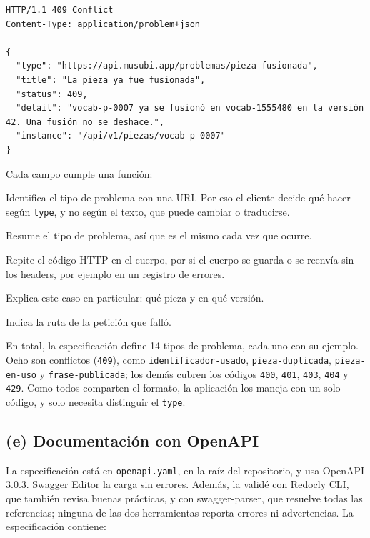 \documentclass[11pt]{article}
\begin{document}
\begin{lstlisting}
HTTP/1.1 409 Conflict
Content-Type: application/problem+json

{
  "type": "https://api.musubi.app/problemas/pieza-fusionada",
  "title": "La pieza ya fue fusionada",
  "status": 409,
  "detail": "vocab-p-0007 ya se fusionó en vocab-1555480 en la versión 42. Una fusión no se deshace.",
  "instance": "/api/v1/piezas/vocab-p-0007"
}
\end{lstlisting}

Cada campo cumple una función:

\begin{description}
  \raggedright
  \item[\texttt{type}.] Identifica el tipo de problema con una URI. Por eso el cliente decide qué hacer según \texttt{type}, y no según el texto, que puede cambiar o traducirse.
  \item[\texttt{title}.] Resume el tipo de problema, así que es el mismo cada vez que ocurre.
  \item[\texttt{status}.] Repite el código HTTP en el cuerpo, por si el cuerpo se guarda o se reenvía sin los headers, por ejemplo en un registro de errores.
  \item[\texttt{detail}.] Explica este caso en particular: qué pieza y en qué versión.
  \item[\texttt{instance}.] Indica la ruta de la petición que falló.
\end{description}

En total, la especificación define 14 tipos de problema, cada uno con su ejemplo. Ocho son conflictos (\texttt{409}), como \texttt{identificador-usado}, \texttt{pieza-duplicada}, \texttt{pieza-en-uso} y \texttt{frase-publicada}; los demás cubren los códigos \texttt{400}, \texttt{401}, \texttt{403}, \texttt{404} y \texttt{429}. Como todos comparten el formato, la aplicación los maneja con un solo código, y solo necesita distinguir el \texttt{type}.

\subsection*{(e) Documentación con OpenAPI}

La especificación está en \texttt{openapi.yaml}, en la raíz del repositorio, y usa OpenAPI 3.0.3. Swagger Editor la carga sin errores. Además, la validé con Redocly CLI, que también revisa buenas prácticas, y con swagger-parser, que resuelve todas las referencias; ninguna de las dos herramientas reporta errores ni advertencias. La especificación contiene:
\end{document}

